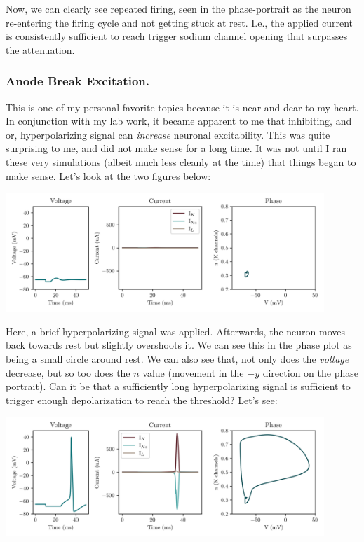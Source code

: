 Now, we can clearly see repeated firing, seen in the phase-portrait as the neuron re-entering the firing cycle and not getting stuck at rest. I.e., the applied current is consistently sufficient to reach trigger sodium channel opening that surpasses the attenuation. 

\subsubsection{Anode Break Excitation.}

This is one of my personal favorite topics because it is near and dear to my heart. In conjunction with my lab work, it became apparent to me that inhibiting, and or, hyperpolarizing signal can \textit{increase} neuronal excitability. This was quite surprising to me, and did not make sense for a long time. It was not until I ran these very simulations (albeit much less cleanly at the time) that things began to make sense. Let's look at the two figures below: 

\begin{center}
\includegraphics[width=0.9\textwidth]{images/models/hhanode1.png}
\end{center}

Here, a brief hyperpolarizing signal was applied. Afterwards, the neuron moves back towards rest but slightly overshoots it. We can see this in the phase plot as being a small circle around rest. We can also see that, not only does the \textit{voltage} decrease, but so too does the $n$ value (movement in the $-y$ direction on the phase portrait). Can it be that a sufficiently long hyperpolarizing signal is sufficient to trigger enough depolarization to reach the threshold? Let's see: 

\begin{center}
\includegraphics[width=0.9\textwidth]{images/models/hhanode2.png}
\end{center}

